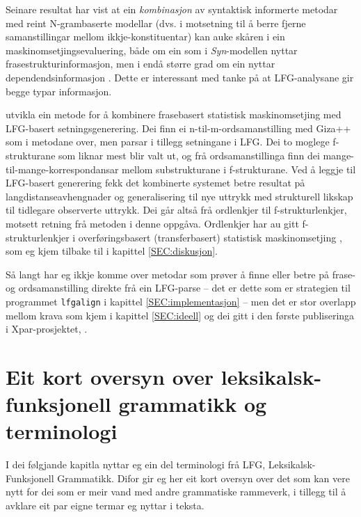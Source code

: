 \documentclass[12pt,a4paper,oneside,draft]{report}
\begin{document}
Seinare resultat har vist at ein \emph{kombinasjon} av syntaktisk
 informerte metodar med reint N-grambaserte modellar (dvs. i
 motsetning til å berre fjerne samanstillingar mellom
 ikkje\hyp{}konstituentar) kan auke skåren i ein
 maskinomsetjingsevaluering, både om ein som i \emph{Syn}-modellen nyttar
 frasestrukturinformasjon, men i endå større grad om ein nyttar
 dependendsinformasjon \citep{tinsley2007ept,hearne2008ccd}. Dette er
 interessant med tanke på at LFG-analysane gir begge typar
 informasjon.

\citet{riezler2006gmt} utvikla ein metode for å kombinere frasebasert
 statistisk maskinomsetjing med LFG-basert setningsgenerering. Dei
 finn ei n-til-m-ordsamanstilling med Giza++ som i metodane over, men
 parsar i tillegg setningane i LFG. Dei to moglege f\hyp{}strukturane som
 liknar mest blir valt ut, og frå ordsamanstillinga finn dei
 mange-til-mange-korrespondansar mellom substrukturane i
 f\hyp{}strukturane. Ved å leggje til LFG-basert generering fekk det
 kombinerte systemet betre resultat på langdistanseavhengnader og
 generalisering til nye uttrykk med strukturell likskap til tidlegare
 observerte uttrykk. Dei går altså frå ordlenkjer til
 f\hyp{}strukturlenkjer, motsett retning frå metoden i denne
 oppgåva. Ordlenkjer har au gitt f\hyp{}strukturlenkjer i overføringsbasert
 (transferbasert) statistisk maskinomsetjing
 \citep{graham2010dsl,graham2009osr,graham2009fts}, som eg kjem
 tilbake til i kapittel \ref{SEC:diskusjon}.

Så langt har eg ikkje komme over metodar som prøver å finne eller
 betre på frase- og ordsamanstilling direkte frå ein LFG-parse -- det
 er dette som er strategien til programmet \texttt{lfgalign} i kapittel
 \ref{SEC:implementasjon} -- men det er stor overlapp mellom krava som
 kjem i kapittel \ref{SEC:ideell} og dei gitt i den første
 publiseringa i Xpar-prosjektet, \citet{dyvik2009lmp}.

\section{Eit kort oversyn over leksikalsk-funksjonell grammatikk og terminologi}
\label{sec-2.2}

 \label{SEC:omgrepsavklaring}

 I dei følgjande kapitla nyttar eg ein del terminologi frå LFG,
 Leksikalsk-Funksjonell Grammatikk. Difor gir eg her eit kort oversyn
 over det som kan vere nytt for dei som er meir vand med andre
 grammatiske rammeverk, i tillegg til å avklare eit par eigne termar
 eg nyttar i teksta.
\end{document}

